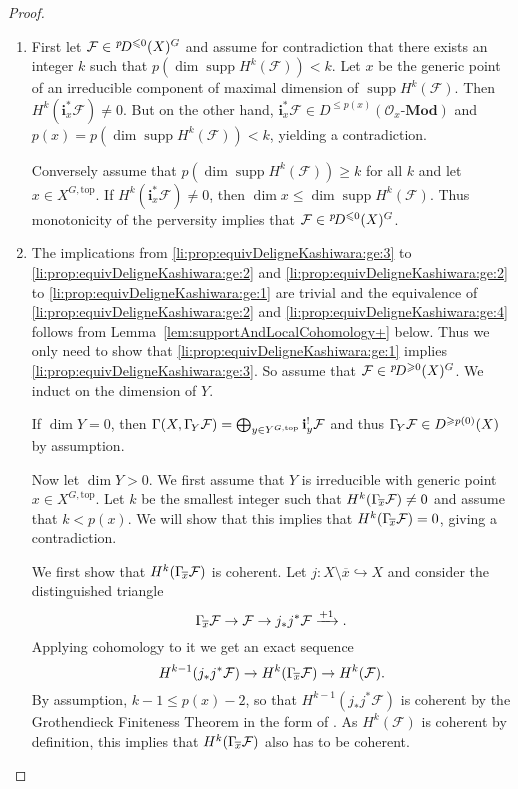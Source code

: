 \documentclass{compositio}
\theoremstyle{plain}
\theoremstyle{definition}
\theoremstyle{remark}
\newcommand\sheaf{\mathcal}
\newcommand\sO{\sheaf{O}}
\newcommand\cat{\mathbf}
\newcommand\catModules[1]{#1\text{-}\cat{Mod}}
\newcommand\supp{\operatorname{supp}}
\newcommand\perv[1][p]{\mkern1mu{}^{#1}\mkern-3mu}
\newcommand\lc[1]{\Gamma_{\mkern-3mu#1}}
\newcommand\Xtop[1][X]{#1^{G,\mathrm{top}}}
\begin{document}
\begin{proof}\leavevmode
    \begin{enumerate}
        \item
            First let $\sheaf F \in  \perv D^{\leq 0}(X)^G$ and assume for contradiction that there exists an integer $k$ such that $p(\dim \supp H^{k}(\sheaf F)) < k$.
            Let $x$ be the generic point of an irreducible component of maximal dimension of $\supp H^{k}(\sheaf F)$.
            Then $H^k(\mathbf i_x^* \sheaf F) \ne 0$. 
            But on the other hand, $\mathbf i_x^*\sheaf F \in  D^{\leq p(x)}(\catModules{\sO_x})$ and $p(x) = p(\dim \supp H^{k}(\sheaf F)) < k$, yielding a contradiction.

            Conversely assume that $p(\dim \supp H^{k}(\sheaf F)) \geq  k$ for all $k$ and let $x \in  \Xtop$.
            If $H^k(\mathbf i_x^*\sheaf F) \ne 0$, then $\dim x \leq  \dim \supp H^{k}(\sheaf F)$.
            Thus monotonicity of the perversity implies that $\sheaf F \in  \perv D^{\leq 0}(X)^G$.
        \item
            The implications from \ref{li:prop:equivDeligneKashiwara:ge:3} to \ref{li:prop:equivDeligneKashiwara:ge:2} and \ref{li:prop:equivDeligneKashiwara:ge:2} to \ref{li:prop:equivDeligneKashiwara:ge:1} are trivial and the equivalence of \ref{li:prop:equivDeligneKashiwara:ge:2} and \ref{li:prop:equivDeligneKashiwara:ge:4} follows from Lemma~\ref{lem:supportAndLocalCohomology+} below.
            Thus we only need to show that \ref{li:prop:equivDeligneKashiwara:ge:1} implies \ref{li:prop:equivDeligneKashiwara:ge:3}.
            So assume that $\sheaf F \in  \perv D^{\geq 0}(X)^G$.
            We induct on the dimension of $Y$.
            
            If $\dim Y = 0$, then $\Gamma (X,\lc Y \sheaf F) = \bigoplus_{y \in  \Xtop[Y]} \mathbf i_y^!\sheaf F$ and thus $\lc Y\sheaf F \in  D^{\geq p(0)}(X)$ by assumption.

            Now let $\dim Y > 0$.
            We first assume that $Y$ is irreducible with generic point $x \in  \Xtop$.
            Let $k$ be the smallest integer such that $H^k(\lc {\overline x} \sheaf F) \ne 0$ and assume that $k < p(x)$.
            We will show that this implies that $H^k(\lc {\overline x}\sheaf F) = 0$, giving a contradiction.

            We first show that $H^k(\lc {\overline x}\sheaf F)$ is coherent.
            Let $j\colon X \setminus {\overline x} \hookrightarrow X$ and consider the distinguished triangle
            \[
                \lc {\overline x} \sheaf F \to  \sheaf F \to  j_*j^* \sheaf F \xrightarrow{+1}.
            \]
            Applying cohomology to it we get an exact sequence
            \[
                H^{k-1}(j_*j^*\sheaf F) \to  H^k(\lc{\overline x} \sheaf F) \to  H^k(\sheaf F).
            \]
            By assumption, $k-1 \le p(x) - 2$, so that $H^{k-1}(j_*j^*\sheaf F)$ is coherent by the Grothendieck Finiteness Theorem in the form of \cite[Corollary~3]{Bezrukavnikov:arXiv:PerverseCoherentSheaves}.
            As $H^k(\sheaf F)$ is coherent by definition, this implies that $H^k(\lc{\overline x} \sheaf F)$ also has to be coherent.


\end{enumerate}
\end{proof}
\end{document}
